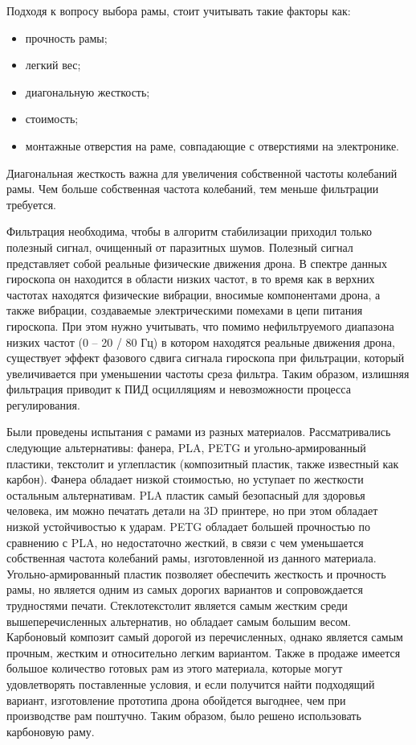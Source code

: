 Подходя к вопросу выбора рамы, стоит учитывать такие факторы как:
\begin{itemize}
	\item прочность рамы;
	\item легкий вес;
	\item диагональную жесткость;
	\item стоимость;
	\item монтажные отверстия на раме, совпадающие с отверстиями на электронике.
\end{itemize}

Диагональная жесткость важна для увеличения собственной частоты колебаний рамы. Чем больше собственная частота колебаний, тем меньше фильтрации требуется.

Фильтрация необходима, чтобы в алгоритм стабилизации приходил только полезный сигнал, очищенный от паразитных шумов.
Полезный сигнал представляет собой реальные физические движения дрона. В спектре данных гироскопа он находится в области низких частот, в то время как в верхних частотах находятся физические вибрации, вносимые компонентами дрона, а также вибрации, создаваемые электрическими помехами в цепи питания гироскопа.
При этом нужно учитывать, что помимо нефильтруемого диапазона низких частот (0 -- 20 / 80 Гц) в котором находятся реальные движения дрона, существует эффект фазового сдвига сигнала гироскопа при фильтрации, который увеличивается при уменьшении частоты среза фильтра. Таким образом, излишняя фильтрация приводит к ПИД осцилляциям и невозможности процесса регулирования.

Были проведены испытания с рамами из разных материалов. Рассматривались следующие альтернативы: фанера, PLA, PETG и угольно-армиро\-ван\-ный пластики, текстолит и углепластик (композитный пластик, также известный как карбон). Фанера обладает низкой стоимостью, но уступает по жесткости остальным альтернативам. PLA пластик самый безопасный для здоровья человека, им можно печатать детали на 3D принтере, но при этом обладает низкой устойчивостью к ударам. PETG обладает большей прочностью по сравнению с PLA, но недостаточно жесткий, в связи с чем уменьшается собственная частота колебаний рамы, изготовленной из данного материала. Угольно-армированный пластик позволяет обеспечить жесткость и прочность рамы, но является одним из самых дорогих вариантов и сопровождается трудностями печати.
Стеклотекстолит является самым жестким среди вышеперечисленных альтернатив, но обладает самым большим весом. Карбоновый композит самый дорогой из перечисленных, однако является самым прочным, жестким и относительно легким вариантом. Также в продаже имеется большое количество готовых рам из этого материала, которые могут удовлетворять поставленные условия, и если получится найти подходящий вариант, изготовление прототипа дрона обойдется выгоднее, чем при производстве рам поштучно. Таким образом, было решено использовать карбоновую раму.

